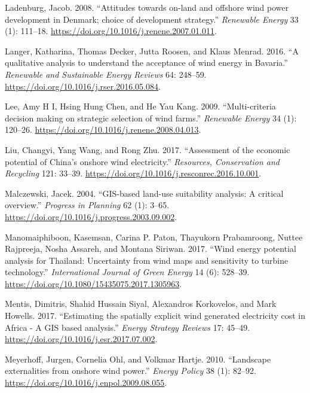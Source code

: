 \documentclass[a4paper,]{article}
\theoremstyle{definition}
\theoremstyle{definition}
\theoremstyle{definition}
\theoremstyle{remark}
\begin{document}
\leavevmode\hypertarget{ref-Ladenburg2008}{}%
Ladenburg, Jacob. 2008. ``Attitudes towards on-land and offshore wind
power development in Denmark; choice of development strategy.''
\emph{Renewable Energy} 33 (1): 111--18.
\url{https://doi.org/10.1016/j.renene.2007.01.011}.

\leavevmode\hypertarget{ref-Langer2016}{}%
Langer, Katharina, Thomas Decker, Jutta Roosen, and Klaus Menrad. 2016.
``A qualitative analysis to understand the acceptance of wind energy in
Bavaria.'' \emph{Renewable and Sustainable Energy Reviews} 64: 248--59.
\url{https://doi.org/10.1016/j.rser.2016.05.084}.

\leavevmode\hypertarget{ref-Lee2009}{}%
Lee, Amy H I, Hsing Hung Chen, and He Yau Kang. 2009. ``Multi-criteria
decision making on strategic selection of wind farms.'' \emph{Renewable
Energy} 34 (1): 120--26.
\url{https://doi.org/10.1016/j.renene.2008.04.013}.

\leavevmode\hypertarget{ref-Liu2017}{}%
Liu, Changyi, Yang Wang, and Rong Zhu. 2017. ``Assessment of the
economic potential of China's onshore wind electricity.''
\emph{Resources, Conservation and Recycling} 121: 33--39.
\url{https://doi.org/10.1016/j.resconrec.2016.10.001}.

\leavevmode\hypertarget{ref-Malczewski2004}{}%
Malczewski, Jacek. 2004. ``GIS-based land-use suitability analysis: A
critical overview.'' \emph{Progress in Planning} 62 (1): 3--65.
\url{https://doi.org/10.1016/j.progress.2003.09.002}.

\leavevmode\hypertarget{ref-Manomaiphiboon2017}{}%
Manomaiphiboon, Kasemsan, Carina P. Paton, Thayukorn Prabamroong, Nuttee
Rajpreeja, Nosha Assareh, and Montana Siriwan. 2017. ``Wind energy
potential analysis for Thailand: Uncertainty from wind maps and
sensitivity to turbine technology.'' \emph{International Journal of
Green Energy} 14 (6): 528--39.
\url{https://doi.org/10.1080/15435075.2017.1305963}.

\leavevmode\hypertarget{ref-Mentis2017}{}%
Mentis, Dimitris, Shahid Hussain Siyal, Alexandros Korkovelos, and Mark
Howells. 2017. ``Estimating the spatially explicit wind generated
electricity cost in Africa - A GIS based analysis.'' \emph{Energy
Strategy Reviews} 17: 45--49.
\url{https://doi.org/10.1016/j.esr.2017.07.002}.

\leavevmode\hypertarget{ref-Meyerhoff2010}{}%
Meyerhoff, Jurgen, Cornelia Ohl, and Volkmar Hartje. 2010. ``Landscape
externalities from onshore wind power.'' \emph{Energy Policy} 38 (1):
82--92. \url{https://doi.org/10.1016/j.enpol.2009.08.055}.
\end{document}
